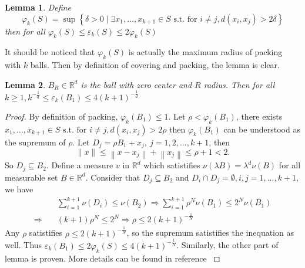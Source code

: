 \documentclass[12pt, a4paper, oneside]{article}
\newtheorem{lemma}{Lemma}
\begin{document}
\begin{lemma}
	Define 
	\begin{equation}
		\varphi_{k}(S)=\sup \left\{\delta>0 \mid \exists x_{1}, \ldots, x_{k+1} \in S \text { s.t. for } i \neq j, d\left(x_{i}, x_{j}\right)>2 \delta\right\}
	\end{equation} then for all $\varphi_{k}(S) \leq \varepsilon_{k}(S) \leq 2 \varphi_{k}(S)$
\end{lemma}

It should be noticed that $\varphi_{k}(S)$ is actually the maximum radius of packing with $k$ balls. Then by definition of covering and packing, the lemma is clear.


\begin{lemma}
	\label{lm:net}
	$B_R\in \mathbb{R}^d$ is the ball with zero center and $R$ radius. Then for all
	$k \geq 1, k^{-\frac{1}{d}} \leq \varepsilon_{k}\left(B_{1}\right) \leq 4(k+1)^{-\frac{1}{d}}$
\end{lemma}

\begin{proof}
	By definition of packing, $\varphi_{k}(B_1)\leq 1$. Let $\rho < \varphi_{k}(B_1)$, there exists $ x_{1}, \ldots, x_{k+1} \in S \text { s.t. for } i \neq j, d\left(x_{i}, x_{j}\right)>2 \rho$ then $\varphi_{k}(B_1)$ can be understood as the supremum of $\rho$. Let $D_j = \rho B_1 + x_j,\ j = 1, 2, ..., k+1$, then 
	\begin{equation}
		\|x\| \leq\left\|x-x_{j}\right\|+\left\|x_{j}\right\| \leq \rho+1<2.
	\end{equation}
	So $D_j \subseteq B_2$.
	Define a measure $v$ in $\mathbb{R}^d$ which satistifies $\nu(\lambda B)=\lambda^{d} \nu(B)$ for all measurable set $B\in \mathbb{R}^d$. Consider that $D_j \subseteq B_2$ and $D_i \cap D_j = \emptyset, i, j = 1, ..., k+1$, we have 
	\begin{equation}
		\begin{aligned}
			& \sum_{i=1}^{k+1} \nu\left(D_{i}\right) \leq \nu\left(B_{2}\right) \Rightarrow \sum_{i=1}^{k+1} \rho^{N} \nu\left(B_{1}\right) \leq 2^{N} \nu\left(B_{1}\right) \\
			\Rightarrow \quad &(k+1) \rho^{N} \leq 2^{N} \Rightarrow \rho \leq 2(k+1)^{-\frac{1}{N}}
		\end{aligned}
	\end{equation}
	Any $\rho$ satistifies $\rho \leq 2(k+1)^{-\frac{1}{N}}$, so the supremum satistifies the inequation as well. Thus $\varepsilon_{k}\left(B_{1}\right) \leq 2\varphi_{k}(S)  \leq 4(k+1)^{-\frac{1}{N}}$.
	Similarly, the other part of lemma is proven. More details can be found in reference \cite{net}
\end{proof}
\end{document}

